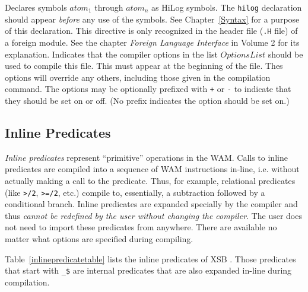 \begin{description}
	Declares symbols $atom_1$ through $atom_n$ as HiLog symbols.
	The {\tt hilog} declaration should appear {\em before} any use of
	the symbols.  See Chapter~\ref{Syntax} for a purpose of this
 	declaration.
        This directive is only recognized in the header file ({\tt .H} file) 
	of a foreign module. See the chapter {\it Foreign Language
Interface} in Volume 2 for its explanation.
	Indicates that the compiler options in the list $OptionsList$
	should be used to compile this file.  This must appear at the
	beginning of the file.  Thes options will override any others,
	including those given in the compilation command.  The options
	may be optionally prefixed with \verb|+| or \verb|-| to
	indicate that they should be set on or off.  (No prefix
	indicates the option should be set on.)

\end{description}

\subsection{Inline Predicates}\label{inline_predicates}

{\em Inline predicates} represent ``primitive'' operations in the
WAM.  Calls to inline predicates are compiled into a sequence of WAM
instructions in-line, i.e. without actually making a call to the
predicate.  Thus, for example, relational predicates (like {\tt >/2},
{\tt >=/2}, etc.) compile to, essentially, a subtraction followed by
a conditional branch.  Inline predicates are expanded specially by
the compiler and thus {\em cannot be redefined by the user without
changing the compiler}.  The user does not need to import these
predicates from anywhere.  There are available no matter what options
are specified during compiling.

Table~\ref{inlinepredicatetable} lists the inline predicates of
XSB \version.  Those predicates that start with \verb|_$|
are internal predicates that are also expanded in-line during
compilation.

\begin{table}[htbp]
\caption{The Inline Predicates of \ourprolog}\label{inlinepredicatetable}
\end{table}

